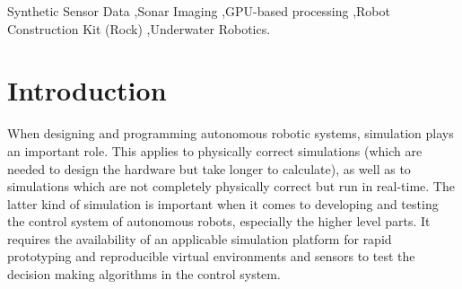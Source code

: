 \documentclass[final,5p,times]{elsarticle}
\begin{document}
\begin{frontmatter}
\begin{abstract}

\end{abstract}

\begin{keyword}
Synthetic Sensor Data \sep Sonar Imaging  \sep GPU-based processing \sep Robot Construction Kit (Rock) \sep Underwater Robotics.

\end{keyword}

\end{frontmatter}

\linenumbers

\section{Introduction}
\label{introduction}

When designing and programming autonomous robotic systems, simulation plays an important role. This applies to physically correct simulations (which are needed to design the hardware but take longer to calculate), as well as to simulations which are not completely physically correct but run in real-time. The latter kind of simulation is important when it comes to developing and testing the control system of autonomous robots, especially the higher level parts. It requires the availability of an applicable simulation platform for rapid prototyping and reproducible virtual environments and sensors to test the decision making algorithms in the control system.
\end{document}
